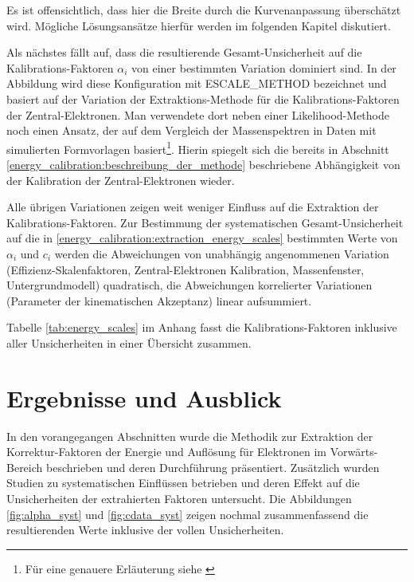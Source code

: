 Es ist offensichtlich, dass hier die Breite durch die Kurvenanpassung 
überschätzt wird. Mögliche Lösungsansätze hierfür werden im folgenden Kapitel
diskutiert.

Als nächstes fällt auf, dass die resultierende Gesamt-Unsicherheit auf die
Kalibrations-Faktoren $\alpha_i$ von einer bestimmten Variation dominiert sind.
In der Abbildung wird diese Konfiguration mit ESCALE\_METHOD bezeichnet und
basiert auf der Variation der Extraktions-Methode für die Kalibrations-Faktoren
der Zentral-Elektronen. Man verwendete dort neben einer Likelihood-Methode noch
einen Ansatz, der auf dem Vergleich der Massenspektren in Daten mit simulierten
Formvorlagen basiert\footnote{Für eine genauere Erläuterung siehe
\cite{Agustoni:1335395}}. Hierin spiegelt sich die bereits in Abschnitt
\ref{energy_calibration:beschreibung_der_methode} beschriebene Abhängigkeit
von der Kalibration der Zentral-Elektronen wieder.

Alle übrigen Variationen zeigen weit weniger Einfluss auf die Extraktion der
Kalibrations-Faktoren. Zur Bestimmung der systematischen Gesamt-Unsicherheit auf
die in \ref{energy_calibration:extraction_energy_scales} bestimmten Werte von
$\alpha_i$ und $c_i$ werden die Abweichungen von unabhängig angenommenen
Variation (Effizienz-Skalenfaktoren, Zentral-Elektronen Kalibration,
Massenfenster, Untergrundmodell) quadratisch, die Abweichungen korrelierter
Variationen (Parameter der kinematischen Akzeptanz) linear aufsummiert.

Tabelle \ref{tab:energy_scales} im Anhang fasst die Kalibrations-Faktoren
inklusive aller Unsicherheiten in einer Übersicht zusammen.



%
\section{Ergebnisse und Ausblick}
\label{energy_calibration:ergebnisse_und_ausblick}


In den vorangegangen Abschnitten wurde die Methodik zur Extraktion der
Korrektur-Faktoren der Energie und Auflösung für Elektronen im
Vorwärts-Bereich beschrieben und deren Durchführung präsentiert. Zusätzlich
wurden Studien zu systematischen Einflüssen betrieben und deren Effekt auf die
Unsicherheiten der extrahierten Faktoren untersucht. Die Abbildungen
\ref{fig:alpha_syst} und \ref{fig:cdata_syst} zeigen nochmal zusammenfassend
die resultierenden Werte inklusive der vollen Unsicherheiten.

